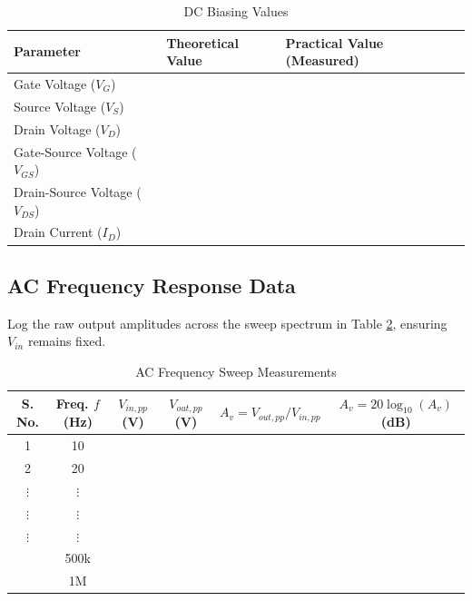 \begin{table}[h!]
	\centering
	\caption{DC Biasing Values}
	\label{tab:dc_obs_mos}
	\begin{tabularx}{\textwidth}{lXll}
		\toprule
		\textbf{Parameter} & \textbf{Theoretical Value} & \textbf{Practical Value (Measured)} & \\
		\midrule
		Gate Voltage ($V_G$) &  &  \\
		Source Voltage ($V_S$) &  &  \\
		Drain Voltage ($V_D$) &  &  \\
		Gate-Source Voltage ($V_{GS}$) &  &  \\
		Drain-Source Voltage ($V_{DS}$) &  &  \\
		Drain Current ($I_D$) &  &  \\
		\bottomrule
	\end{tabularx}
\end{table}

\subsection{AC Frequency Response Data}
Log the raw output amplitudes across the sweep spectrum in Table \ref{tab:ac_obs_mos}, ensuring $V_{in}$ remains fixed.

\begin{table}[h!]
	\centering
	\begin{tabular}{@{}cccccc@{}}
		\toprule
		S. No. & Freq. $f$ (Hz) & $V_{in,pp}$ (V) & $V_{out,pp}$ (V) & $A_v = V_{out,pp}/V_{in,pp}$ & $A_v = 20\log_{10}(A_v)$ (dB) \\
		\midrule
		1& 10	&  &  &  &  \\
		2& 20	&  &  &  &  \\
		$\vdots$ & $\vdots$	&  &  &  &  \\
		$\vdots$&$\vdots$	&  &  &  &  \\
		$\vdots$&$\vdots$	&  &  &  &  \\
		& 500k	&  &  &  &  \\
		& 1M	&  &  &  &  \\
		\bottomrule
	\end{tabular}
	\caption{AC Frequency Sweep Measurements}
	\label{tab:ac_obs_mos}
\end{table}

